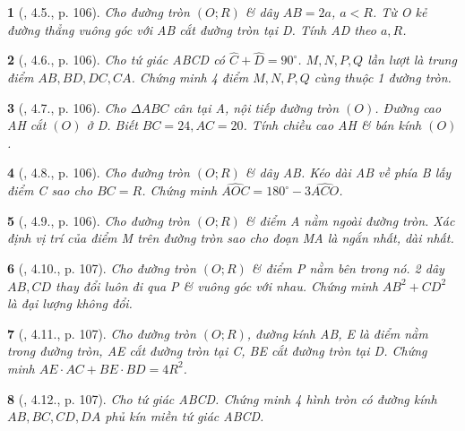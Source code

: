 \documentclass{article}
\newtheorem{baitoan}{}
\begin{document}
\begin{baitoan}[\cite{Binh_boi_duong_Toan_9_tap_1}, 4.5., p. 106]
	Cho đường tròn $(O;R)$ \& dây $AB = 2a$, $a < R$. Từ O kẻ đường thẳng vuông góc với AB cắt đường tròn tại D. Tính AD theo $a,R$.
\end{baitoan}

\begin{baitoan}[\cite{Binh_boi_duong_Toan_9_tap_1}, 4.6., p. 106]
	Cho tứ giác ABCD có $\widehat{C} + \widehat{D} = 90^\circ$. $M,N,P,Q$ lần lượt là trung điểm $AB,BD,DC,CA$. Chứng minh 4 điểm $M,N,P,Q$ cùng thuộc 1 đường tròn.
\end{baitoan}

\begin{baitoan}[\cite{Binh_boi_duong_Toan_9_tap_1}, 4.7., p. 106]
	Cho $\Delta ABC$ cân tại A, nội tiếp đường tròn $(O)$. Đường cao AH cắt $(O)$ ở D. Biết $BC = 24,AC = 20$. Tính chiều cao AH \& bán kính $(O)$.
\end{baitoan}

\begin{baitoan}[\cite{Binh_boi_duong_Toan_9_tap_1}, 4.8., p. 106]
	Cho đường tròn $(O;R)$ \& dây AB. Kéo dài AB về phía B lấy điểm C sao cho $BC = R$. Chứng minh $\widehat{AOC} = 180^\circ - 3\widehat{ACO}$.
\end{baitoan}

\begin{baitoan}[\cite{Binh_boi_duong_Toan_9_tap_1}, 4.9., p. 106]
	Cho đường tròn $(O;R)$ \& điểm A nằm ngoài đường tròn. Xác định vị trí của điểm M trên đường tròn sao cho đoạn MA là ngắn nhất, dài nhất.
\end{baitoan}

\begin{baitoan}[\cite{Binh_boi_duong_Toan_9_tap_1}, 4.10., p. 107]
	Cho đường tròn $(O;R)$ \& điểm P nằm bên trong nó. 2 dây $AB,CD$ thay đổi luôn đi qua P \& vuông góc với nhau. Chứng minh $AB^2 + CD^2$ là đại lượng không đổi.
\end{baitoan}

\begin{baitoan}[\cite{Binh_boi_duong_Toan_9_tap_1}, 4.11., p. 107]
	Cho đường tròn $(O;R)$, đường kính AB, E là điểm nằm trong đường tròn, AE cắt đường tròn tại C, BE cắt đường tròn tại D. Chứng minh $AE\cdot AC + BE\cdot BD = 4R^2$.
\end{baitoan}

\begin{baitoan}[\cite{Binh_boi_duong_Toan_9_tap_1}, 4.12., p. 107]
	Cho tứ giác ABCD. Chứng minh 4 hình tròn có đường kính $AB,BC,CD,DA$ phủ kín miền tứ giác ABCD.
\end{baitoan}
\end{document}
